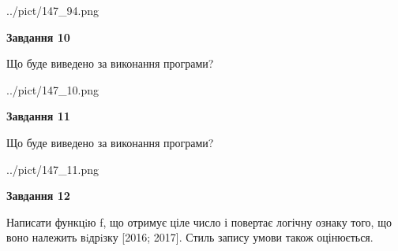 \documentclass[12pt, ukrainian]{article}
\begin{document}
{\begin {large}
\begin{center}
	{../pict/147_94.png}
\end{center}
\newpage

{\begin {center}\textbf{Завдання 10}\end {center}}

Що буде виведено за виконання програми?\par
\begin{center}
	{../pict/147_10.png}
\end{center}
\newpage

{\begin {center}\textbf{Завдання 11}\end {center}}

Що буде виведено за виконання програми?\par
\begin{center}
	{../pict/147_11.png}
\end{center}
\newpage

{\begin {center}\textbf{Завдання 12}\end {center}}


Написати функцiю f, що отримує ціле число і повертає логічну ознаку того, що воно належить вiдрiзку [2016; 2017]. Стиль запису умови також оцінюється.\par
\newpage

\end {large}}
\end{document}
